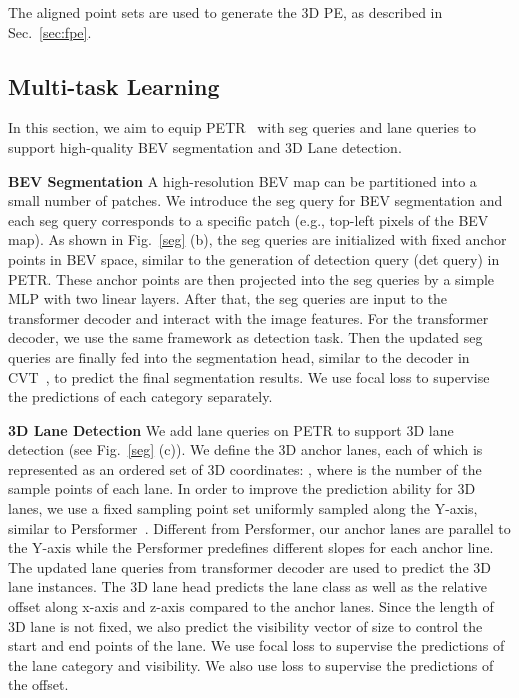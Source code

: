 \documentclass[10pt,twocolumn,letterpaper]{article}
\begin{document}
The aligned point sets  are used to generate the 3D PE, as described in Sec.~\ref{sec:fpe}. 

\subsection{Multi-task Learning}
In this section, we aim to equip PETR~\cite{liu2022petr} with seg queries and lane queries to support high-quality BEV segmentation and 3D Lane detection.


\noindent \textbf{BEV Segmentation} 
A high-resolution BEV map can be partitioned into a small number of patches. 
We introduce the seg query for BEV segmentation and each seg query corresponds to a specific patch (e.g., top-left  pixels of the BEV map). As shown in Fig.~\ref{seg} (b), the seg queries are initialized with fixed anchor points in BEV space, similar to the generation of detection query (det query) in PETR. These anchor points are then projected into the seg queries by a simple MLP with two linear layers. After that, the seg queries are input to the transformer decoder and interact with the image features. For the transformer decoder, we use the same framework as detection task. Then the updated seg queries are finally fed into the segmentation head, similar to the decoder in CVT~\cite{zhou2022cross}, to predict the final segmentation results. We use focal loss to supervise the predictions of each category separately.






\noindent \textbf{3D Lane Detection}
We add lane queries on PETR to support 3D lane detection (see Fig.~\ref{seg} (c)). We define the 3D anchor lanes, each of which is represented as an ordered set of 3D coordinates: , where  is the number of the sample points of each lane. In order to improve the prediction ability for 3D lanes, we use a fixed sampling point set uniformly sampled along the Y-axis, similar to Persformer~\cite{chen2022persformer}. 
Different from Persformer, our anchor lanes are parallel to the Y-axis while the Persformer predefines different slopes for each anchor line. The updated lane queries from transformer decoder are used to predict the 3D lane instances. The 3D lane head predicts the lane class  as well as the relative offset  along x-axis and z-axis compared to the anchor lanes. Since the length of 3D lane is not fixed, we also predict the visibility vector  of size  to control the start and end points of the lane. We use focal loss to supervise the predictions of the lane category and visibility. We also use   loss to supervise the predictions of the offset. 
\end{document}

